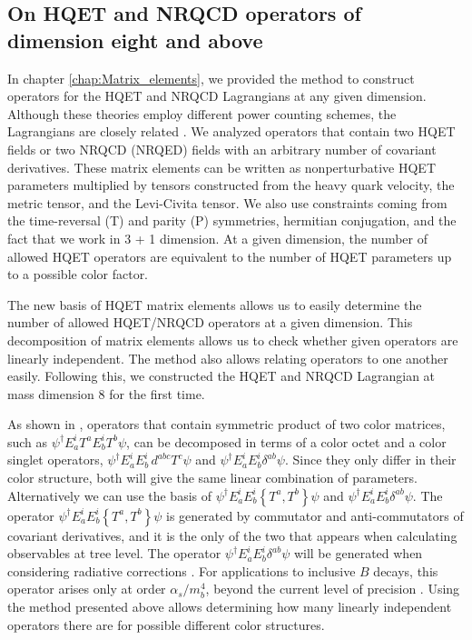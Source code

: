 \subsection{On HQET and NRQCD operators of dimension eight and above}
In chapter \ref{chap:Matrix_elements}, we provided the method to construct operators for the HQET and NRQCD Lagrangians at any given dimension. Although these theories employ different power counting schemes, the Lagrangians are closely related \cite{Manohar:1997qy}. We analyzed operators that contain two HQET fields or two NRQCD (NRQED) fields with an arbitrary number of covariant derivatives. These matrix elements can be written as nonperturbative HQET parameters multiplied by tensors constructed from the heavy quark velocity, the metric tensor, and the Levi-Civita tensor. We also use constraints
coming from the time-reversal (T) and parity (P) symmetries, hermitian conjugation, and the fact that we work in 3 + 1 dimension. At a given dimension, the number of allowed HQET operators are equivalent to the number of HQET parameters up to a possible color factor.\par
The new basis of HQET matrix elements allows us to easily determine the number of allowed HQET/NRQCD operators at a given dimension. This decomposition of matrix elements allows us to check whether given operators are linearly independent. The method also allows relating operators to one another easily. Following this, we constructed the HQET and
NRQCD Lagrangian at mass dimension 8 for the first time.\par
As shown in \cite{Kobach:2017xkw}, operators that contain symmetric product of two color matrices, such as  $\psi^\dagger E^i_aT^a  E^i_bT^b\psi$, can be decomposed in terms of a color octet and a color singlet operators, $\psi^\dagger E^i_a E^i_b\,d^{abc}T^c \psi$ and $\psi^\dagger E^i_a E^i_b \delta^{ab}\psi$. Since they only differ in their color structure, both will give the same linear combination of parameters.  Alternatively we can use the basis of  $\psi^\dagger E^i_a E^i_b\left\{T^a,T^b\right\}\psi$ and $\psi^\dagger E^i_a E^i_b \delta^{ab}\psi$. The operator $\psi^\dagger E^i_a E^i_b\left\{T^a,T^b\right\} \psi$ is generated by commutator and anti-commutators of covariant derivatives, and it is the only of the two that appears when calculating observables at tree level.  The operator $\psi^\dagger E^i_a E^i_b \delta^{ab}\psi$ will be generated when considering radiative corrections \cite{Manohar:1997qy}. For applications to inclusive $B$ decays, this operator arises only at order $\alpha_s/m^4_b$, beyond the current level of precision \cite{Gunawardana:2017zix}. Using the method presented above allows determining how many linearly independent operators there are for possible different color structures.\par

